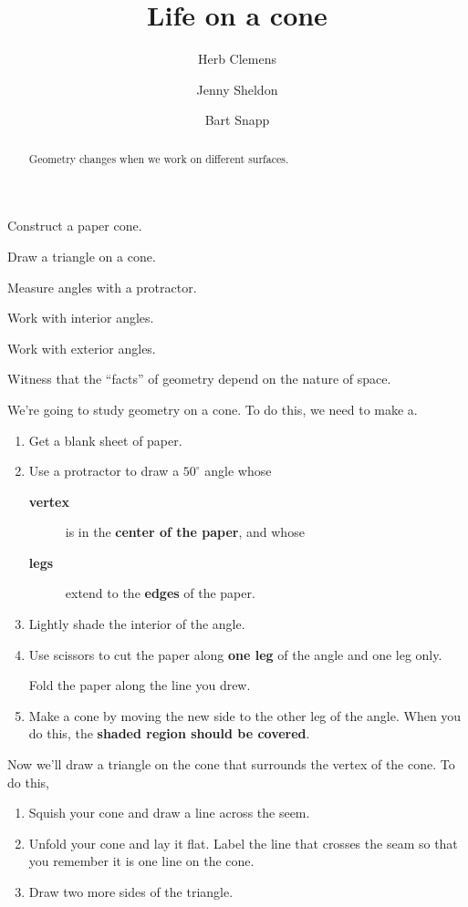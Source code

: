 \documentclass[nooutcomes,noauthor,handout]{ximera}
\title{Life on a cone}
\author{Herb Clemens \and Jenny Sheldon \and Bart Snapp}
\begin{document}
\begin{abstract}
  Geometry changes when we work on different surfaces.
\end{abstract}
\maketitle


\begin{listOutcomes}
\item Construct a paper cone.
\item Draw a triangle on a cone.
\item Measure angles with a protractor.
\item Work with interior angles.
\item Work with exterior angles.
\item Witness that the ``facts'' of geometry depend on the nature of
  space.
\end{listOutcomes}

We're going to study geometry on a cone. To do this, we need to
make a.

\begin{enumerate}
\item Get a blank sheet of paper.
\item Use a protractor to draw a $50^\circ$ angle whose
  \begin{description}
    \item[\textbf{vertex}] is in the \textbf{center of the paper}, and whose
    \item[\textbf{legs}] extend to the \textbf{edges} of the paper.
  \end{description}
  \item {Lightly shade the interior of the angle.}
  \item {Use scissors to cut the paper along \textbf{one leg} of the
    angle and one leg only.} 
    
    Fold the paper along the line you drew.
  \item Make a cone by moving the new side to the other leg of the
    angle. When you do this, the \textbf{shaded region should be covered}.
\end{enumerate}

Now we'll draw a triangle on the cone that surrounds the vertex of the
cone. To do this,
\begin{enumerate}
\item Squish your cone and draw a line across the seem.
\item Unfold your cone and lay it flat. Label the line that crosses the seam so that you remember it is one line on the cone. 
\item Draw two more sides of the triangle.
\end{enumerate}
\end{document}
